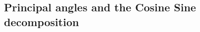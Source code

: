 \documentclass[twoside,11pt]{book}
\numberwithin{theorem}{chapter}
\numberwithin{definition}{chapter}
\numberwithin{proposition}{chapter}
\numberwithin{corollary}{chapter}
\numberwithin{example}{chapter}
\numberwithin{lemma}{chapter}
\numberwithin{assumption}{chapter}
\numberwithin{equation}{chapter}
\numberwithin{figure}{chapter}
\DeclareMathOperator{\Det}{Det}
\begin{document}
\begin{subappendices}



\section{Principal angles and the Cosine Sine decomposition}
\label{app:principal_angles}



\end{subappendices}
\end{document}
